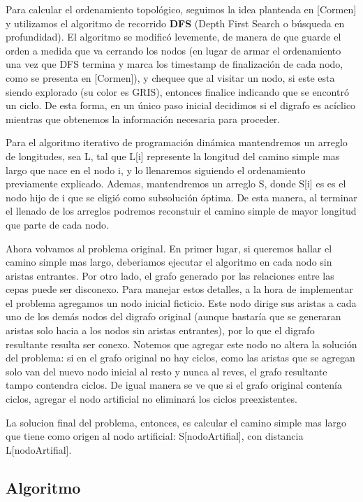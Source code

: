 Para calcular el ordenamiento topol\'ogico, seguimos la idea planteada en [Cormen] y utilizamos el algoritmo de recorrido \textbf{DFS} (Depth First Search o búsqueda en profundidad). El algoritmo se modific\'o levemente, de manera de que guarde el orden a medida que va cerrando los nodos (en lugar de armar el ordenamiento una vez que DFS termina y marca los timestamp de finalizaci\'on de cada nodo, como se presenta en [Cormen]), y chequee que al visitar un nodo, si este esta siendo explorado (su color es GRIS), entonces finalice indicando que se encontr\'o un ciclo.
De esta forma, en un \'unico paso inicial decidimos si el digrafo es ac\'iclico mientras que obtenemos la informaci\'on necesaria para proceder. 

Para el algoritmo iterativo de programaci\'on din\'amica mantendremos un arreglo de longitudes, sea L, tal que L[i] represente la longitud del camino simple mas largo que nace en el nodo i, y lo llenaremos siguiendo el ordenamiento previamente explicado. Ademas, mantendremos un arreglo S, donde S[i] es es el nodo hijo de i que se eligi\'o como subsoluci\'on \'optima. De esta manera, al terminar el llenado de los arreglos podremos reconstuir el camino simple de mayor longitud que parte de cada nodo.

Ahora volvamos al problema original. En primer lugar, si queremos hallar el camino simple mas largo, deberiamos ejecutar el algoritmo en cada nodo sin aristas entrantes. Por otro lado, el grafo generado por las relaciones entre las cepas puede ser disconexo. 
Para manejar estos detalles, a la hora de implementar el problema agregamos un nodo inicial ficticio. Este nodo dirige sus aristas a cada uno de los demás nodos del digrafo original (aunque bastar\'ia que se generaran aristas solo hacia a los nodos sin aristas entrantes), por lo que el digrafo resultante resulta ser conexo. Notemos que agregar este nodo no altera la solución del problema: si en el grafo original no hay ciclos, como las aristas que se agregan solo van del nuevo nodo inicial al resto y nunca al reves, el grafo resultante tampo contendra ciclos. De igual manera se ve que si el grafo original conten\'ia ciclos, agregar el nodo artificial no eliminar\'a los ciclos preexistentes. 

La solucion final del problema, entonces, es calcular el camino simple mas largo que tiene como origen al nodo artificial: S[nodoArtifial], con distancia L[nodoArtifial].



\subsection{Algoritmo}

